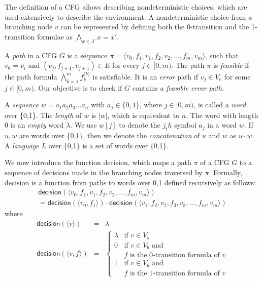 The definition of a CFG allows describing nondeterministic choices, which are used extensively to describe the environment. A nondeterministic choice from a branching node $v$ can be represented by defining both the 0-transition and the 1-transition formulae as $\bigwedge_{x \in \mathcal{X}} x = x'$.

A \emph{path} in a CFG $G$ is a sequence $\pi = \langle v_0, f_1, v_1, f_2, v_2, \dots , f_m, v_m \rangle$, such that $v_0 = v_i$ and $(v_j, f_{j+1}, v_{j+1}) \in E$ for every $j \in [0, m)$. The path $\pi$ is \emph{feasible} if the path formula $\bigwedge_{k=1}^m f_k^{\langle k \rangle}$ is satisfiable. It is an \emph{error} path if $v_j \in V_e$ for some $j \in [0,m)$. Our objective is to check if $G$ contains a \emph{feasible error path}.

A \emph{sequence} $w= a_1a_2a_3 \dots a_n$ with $a_j \in \{0,1\}$, where $j \in [0,m)$, is called a \emph{word} over \{0,1\}. The \emph{length} of $w$ is $|w|$, which is equivalent to $n$. The word with length 0 is an \emph{empty} word $\lambda$. We use $w[j]$ to denote the $j_th$ symbol $a_j$ in a word $w$. If $u, w$ are words over \{0,1\}, then we denote the \emph{concatenation} of $u$ and $w$ as $u \cdot w$. A \emph{language} $L$ over \{0,1\} is a set of words over \{0,1\}.

We now introduce the function \textsf{decision}, which maps a path $\pi$ of a CFG $G$ to a sequence of decisions made in the branching nodes traversed by $\pi$. Formally, \textsf{decision} is a function from paths to words over {0,1} defined recursively as follows:
\begin{multline*}
	\mathsf{decision}(\langle v_0, f_1, v_1, f_2, v_2, \dots, f_m, v_m \rangle) \\
	= \mathsf{decision}(\langle v_0, f_1 \rangle) \cdot \mathsf{decision}(\langle v_1, f_2, v_2, f_3, v_3, \dots, f_m, v_m \rangle)
\end{multline*}
where
\begin{equation*}
	\begin{array}{rcl}
		\mathsf{decision}(\langle v \rangle) & = & \lambda \\
		\mathsf{decision}(\langle v, f \rangle) & = & 
		\begin{cases}
			\lambda & \text{if } v \in V_s \\
			0 		& \text{if } v \in V_b \text{ and } \\
					& f \text{ is the 0-transition formula of }v \\
			1		& \text{if } v \in V_b \text{ and } \\
					& f \text{ is the 1-transition formula of }v 	 
		\end{cases}
	\end{array}
\end{equation*} 

